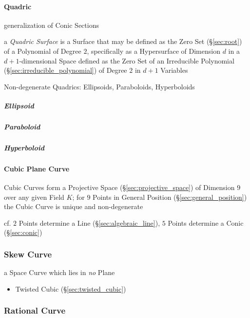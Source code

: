 \paragraph{Quadric}\label{sec:quadric}\hfill

generalization of Conic Sections

a \emph{Quadric Surface} is a Surface that may be defined as the Zero Set
(\S\ref{sec:root}) of a Polynomial of Degree $2$, specifically as a
Hypersurface of Dimension $d$ in a $d+1$-dimensional Space defined as the Zero
Set of an Irreducible Polynomial (\S\ref{sec:irreducible_polynomial}) of Degree
$2$ in $d+1$ Variables

Non-degenerate Quadrics: Ellipsoids, Paraboloids, Hyperboloids



\subparagraph{Ellipsoid}\label{sec:ellipsoid}\hfill

\subparagraph{Paraboloid}\label{sec:paraboloid}\hfill

\subparagraph{Hyperboloid}\label{sec:hyperboloid}\hfill



\paragraph{Cubic Plane Curve}\label{sec:cubic_plane_curve}\hfill

Cubic Curves form a Projective Space (\S\ref{sec:projective_space}) of
Dimension $9$ over any given Field $K$; for $9$ Points in General Position
(\S\ref{sec:general_position}) the Cubic Curve is unique and non-degenerate

cf. $2$ Points determine a Line (\S\ref{sec:algebraic_line}), $5$ Points
determine a Conic (\S\ref{sec:conic})



\subsubsection{Skew Curve}\label{sec:skew_curve}

a Space Curve which lies in \emph{no} Plane

\begin{itemize}
  \item Twisted Cubic (\S\ref{sec:twisted_cubic})
\end{itemize}



\subsubsection{Rational Curve}\label{sec:rational_curve}


